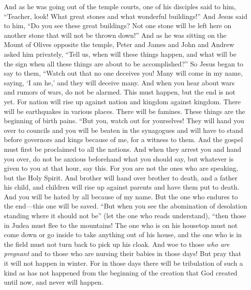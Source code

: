 \begin{biblechapter} %
 And as he was going out of the temple courts, one of his disciples said to him, “Teacher, look! What great stones and what wonderful buildings!”
\verse And Jesus said to him, “Do you see these great buildings? Not one stone will be left here on another stone that will not be thrown down!”
 And as he was sitting on the Mount of Olives opposite the temple, Peter and James and John and Andrew asked him privately,
\verse “Tell us, when will these things happen, and what will be the sign when all these things are about to be accomplished?”
\verse So Jesus began to say to them, “Watch out that no one deceives you!
\verse Many will come in my name, saying, ‘I am he,’ and they will deceive many.
\verse And when you hear about wars and rumors of wars, do not be alarmed. This must happen, but the end is not yet.
\verse For nation will rise up against nation and kingdom against kingdom. There will be earthquakes in various places. There will be famines. These things are the beginning of birth pains.
 “But you, watch out for yourselves! They will hand you over to councils and you will be beaten in the synagogues and will have to stand before governors and kings because of me, for a witness to them.
\verse And the gospel must first be proclaimed to all the nations.
\verse And when they arrest you and hand you over, do not be anxious beforehand what you should say, but whatever is given to you at that hour, say this. For you are not the ones who are speaking, but the Holy Spirit.
\verse And brother will hand over brother to death, and a father his child, and children will rise up against parents and have them put to death.
\verse And you will be hated by all because of my name. But the one who endures to the end—this one will be saved.
 “But when you see the abomination of desolation standing where it should not be” (let the one who reads understand), “then those in Judea must flee to the mountains!
\verse The one who is on his housetop must not come down or go inside to take anything out of his house,
\verse and the one who is in the field must not turn back to pick up his cloak.
\verse And woe to those \textit{who are pregnant} and to those who are nursing their babies in those days!
\verse But pray that it will not happen in winter.
\verse For in those days there will be tribulation of such a kind as has not happened from the beginning of the creation that God created until now, and never will happen.

\end{biblechapter}
